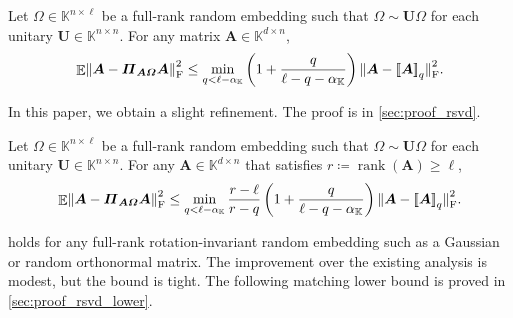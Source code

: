 \documentclass[11pt]{article}
\newcommand{\field}{\mathbb{K}}
\DeclareMathOperator{\rank}{rank}
\newcommand{\mat}[1]{\boldsymbol{#1}}
\newcommand{\lowrank}[1]{%
  \mleft[\!\mleft[ #1 \mright]\!\mright]}
\newcommand{\norm}[1]{\mleft\| #1 \mright\|}
\DeclareMathOperator{\expect}{\mathbb{E}}
\theoremstyle{definition}
\numberwithin{equation}{section}
\begin{document}
\begin{theorem} \label{fact:randomized-svd}
    Let $\mat{\varOmega} \in \field^{n \times \ell}$ be a full-rank random embedding such that $\mat{\varOmega} \sim \mat{U}\mat{\varOmega}$ for each unitary $\mat{U}\in \field^{n \times n}$.
    For any matrix $\mat{A} \in \field^{d \times n}$, 
    \begin{equation*}
        \expect \norm{\mat{A} - \mat{\varPi}_{\mat{A} \mat{\varOmega}} \mat{A}}_{\rm F}^2 \le \min_{q < \ell - \alpha_\field} \left(1 + \frac{q}{\ell - q - \alpha_\field}\right) 
        \norm{\smash{\mat{A} - \lowrank{\mat{A}}_q}}_{\rm F}^2.
    \end{equation*}
\end{theorem}
\noindent In this paper, we obtain a slight refinement. The proof is in \cref{sec:proof_rsvd}.
%
\begin{theorem} 
\label{thm:rsvd-upper-bound}
    Let $\mat{\varOmega} \in \field^{n \times \ell}$ be a full-rank random embedding such that $\mat{\varOmega} \sim \mat{U}\mat{\varOmega}$ for each unitary $\mat{U}\in \field^{n \times n}$.
    For any $\mat{A} \in \field^{d \times n}$ that satisfies $r \coloneqq \rank(\mat{A}) \geq \ell$,
    \begin{equation*}
        \expect \norm{\mat{A} - \mat{\varPi}_{\mat{A} \mat{\varOmega}} \mat{A}}_{\rm F}^2 \le \min_{q < \ell - \alpha_\field} 
        \frac{r-\ell}{r-q} \left(1 + \frac{q}{\ell - q - \alpha_\field}\right) 
        \norm{\smash{\mat{A} - \lowrank{\mat{A}}_q}}_{\rm F}^2.
    \end{equation*}
\end{theorem}
%
\noindent {} holds for any full-rank rotation-invariant random embedding such as a Gaussian or random orthonormal matrix.
The improvement over the existing analysis is modest, but the bound is tight.
The following matching lower bound is proved in \cref{sec:proof_rsvd_lower}.
\end{document}
